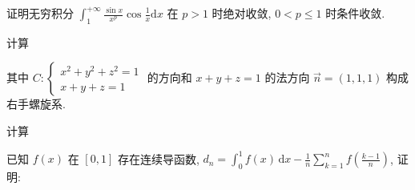 \par{}
证明无穷积分 $\int_{1}^{+\infty} \frac{\sin x}{x^p} \cos \frac{1}{x} \mathrm{d}x$ 在 $p > 1$ 时绝对收敛, $0 < p \leq 1$ 时条件收敛.\par
\par{}
\par{}
计算\par
\nopagebreak[4]
其中 $C: \left\{ \begin{array}{l} x^2 + y^2 + z^2 = 1 \\ x + y + z = 1 \end{array} \right.$ 的方向和 $x + y + z = 1$ 的法方向 $\vec{n} = (1, 1, 1)$ 构成右手螺旋系.\par
\par{}
\par{}
计算\par
\nopagebreak[4]
\par{}
\par{}
已知 $f(x)$ 在 $[0,1]$ 存在连续导函数, $d_n = \int_0^1 f(x) \, \mathrm{d}x - \frac{1}{n} \sum_{k=1}^{n} f\left(\frac{k-1}{n}\right)$, 证明:\par
\nopagebreak[4]

